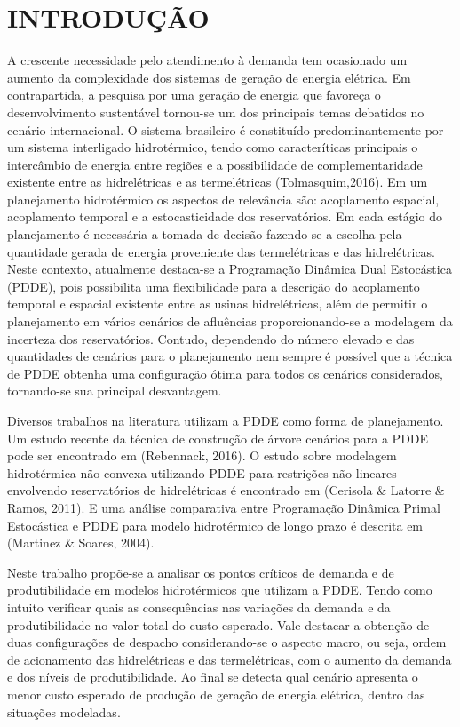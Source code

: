 \documentclass[12pt,fleqn]{article}
\begin{document}
\section{INTRODU\c C\~AO}
A crescente necessidade pelo atendimento \`a demanda tem ocasionado um aumento da complexidade dos
sistemas de gera\c c\~ao de energia el\'etrica. Em contrapartida, a pesquisa por uma gera\c c\~ao de energia que favore\c
ca o desenvolvimento sustent\'avel tornou-se um dos principais temas debatidos no cen\'ario internacional. O sistema brasileiro \'e constitu\'ido predominantemente por um sistema interligado
hidrot\'ermico, tendo como caracter\'iticas principais o interc\^ambio de energia entre regi\~oes e a possibilidade de
complementaridade existente entre as hidrel\'etricas e as termel\'etricas (Tolmasquim,2016). Em um planejamento hidrot\'ermico os aspectos
de relev\^ancia s\~ao: acoplamento espacial, acoplamento temporal e a estocasticidade dos reservat\'orios. Em cada
est\'agio do planejamento \'e necess\'aria a tomada de decis\~ao fazendo-se a escolha pela quantidade gerada de energia
proveniente das termel\'etricas e das hidrel\'etricas. Neste contexto, atualmente destaca-se a Programa\c c\~ao Din\^amica Dual
Estoc\'astica (PDDE), pois possibilita uma flexibilidade para a descri\c c\~ao do acoplamento temporal e espacial existente entre as
usinas hidrel\'etricas, al\'em de permitir o  planejamento em v\'arios cen\'arios de aflu\^encias proporcionando-se a
modelagem da incerteza dos reservat\'orios. Contudo, dependendo do n\'umero elevado e das quantidades de cen\'arios  para o planejamento
nem sempre \'e poss\'ivel que a t\'ecnica de PDDE obtenha uma configura\c c\~ao \'otima para todos os cen\'arios
considerados, tornando-se sua principal desvantagem.

Diversos trabalhos na literatura utilizam a PDDE como forma de planejamento. Um estudo recente da t\'ecnica
de constru\c c\~ao de \'arvore cen\'arios para a PDDE pode ser encontrado em (Rebennack, 2016). O estudo sobre
modelagem hidrot\'ermica n\~ao convexa utilizando PDDE para restri\c c\~oes n\~ao lineares envolvendo reservat\'orios de
hidrel\'etricas \'e encontrado em (Cerisola \& Latorre \& Ramos,
2011). E uma an\'alise comparativa entre Programa\c c\~ao Din\^amica Primal Estoc\'astica e PDDE para modelo
hidrot\'ermico de longo prazo \'e descrita em (Martinez \&
Soares, 2004). 

Neste trabalho propõe-se a analisar os pontos cr\'iticos de demanda e de produtibilidade em modelos hidrot\'ermicos que utilizam a PDDE.
Tendo como intuito verificar quais as consequ\^encias nas varia\c c\~oes da demanda e da produtibilidade no valor total do custo esperado. Vale destacar a obten\c c\~ao de duas configura\c c\~oes de despacho considerando-se o aspecto macro, ou seja, ordem de acionamento das hidrel\'etricas e das termel\'etricas, com o aumento da demanda e dos n\'iveis de produtibilidade.  Ao final se detecta qual cen\'ario apresenta o menor custo esperado de produ\c c\~ao de gera\c c\~ao de energia el\'etrica, dentro das situa\c c\~oes modeladas.
\end{document}
